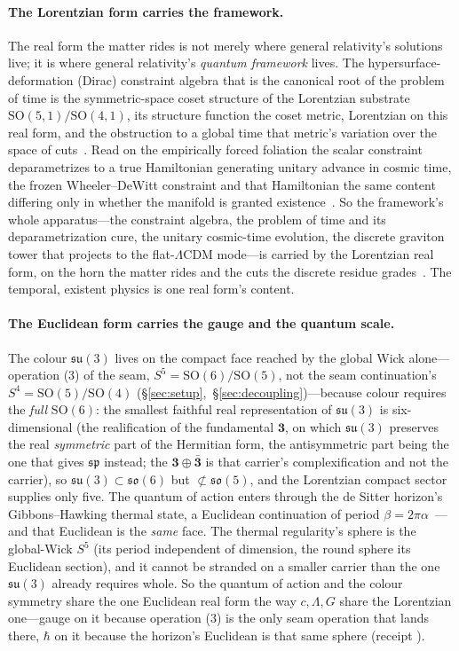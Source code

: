 \documentclass[11pt]{article}
\theoremstyle{plain}
\theoremstyle{remark}
\newcommand{\so}{\mathfrak{so}}
\newcommand{\su}{\mathfrak{su}}
\newcommand{\SO}{\mathrm{SO}}
\begin{document}
\paragraph{The Lorentzian form carries the framework.} The real form the matter rides is not merely where general relativity's solutions live; it is where general relativity's \emph{quantum framework} lives. The hypersurface-deformation (Dirac) constraint algebra that is the canonical root of the problem of time is the symmetric-space coset structure of the Lorentzian substrate $\SO(5,1)/\SO(4,1)$, its structure function the coset metric, Lorentzian on this real form, and the obstruction to a global time that metric's variation over the space of cuts~\cite{JanzenAlgebroid}. Read on the empirically forced foliation the scalar constraint deparametrizes to a true Hamiltonian generating unitary advance in cosmic time, the frozen Wheeler--DeWitt constraint and that Hamiltonian the same content differing only in whether the manifold is granted existence~\cite{JanzenCanonicalTime}. So the framework's whole apparatus---the constraint algebra, the problem of time and its deparametrization cure, the unitary cosmic-time evolution, the discrete graviton tower that projects to the flat-$\Lambda$CDM mode---is carried by the Lorentzian real form, on the horn the matter rides and the cuts the discrete residue grades~\cite{JanzenMatter}. The temporal, existent physics is one real form's content.

\paragraph{The Euclidean form carries the gauge and the quantum scale.} The colour $\su(3)$ lives on the compact face reached by the global Wick alone---operation (3) of the seam, $S^{5}=\SO(6)/\SO(5)$, not the seam continuation's $S^{4}=\SO(5)/\SO(4)$ (\S\ref{sec:setup},~\S\ref{sec:decoupling})---because colour requires the \emph{full} $\SO(6)$: the smallest faithful real representation of $\su(3)$ is six-dimensional (the realification of the fundamental $\mathbf 3$, on which $\su(3)$ preserves the real \emph{symmetric} part of the Hermitian form, the antisymmetric part being the one that gives $\mathfrak{sp}$ instead; the $\mathbf 3\oplus\bar{\mathbf 3}$ is that carrier's complexification and not the carrier), so $\su(3)\subset\so(6)$ but $\not\subset\so(5)$, and the Lorentzian compact sector supplies only five. The quantum of action enters through the de Sitter horizon's Gibbons--Hawking thermal state, a Euclidean continuation of period $\beta=2\pi\alpha$~\cite{JanzenCanonicalTime,JanzenGeometricCore}---and that Euclidean is the \emph{same} face. The thermal regularity's sphere is the global-Wick $S^{5}$ (its period independent of dimension, the round sphere its Euclidean section), and it cannot be stranded on a smaller carrier than the one $\su(3)$ already requires whole. So the quantum of action and the colour symmetry share the one Euclidean real form the way $c,\Lambda,G$ share the Lorentzian one---gauge on it because operation (3) is the only seam operation that lands there, $\hbar$ on it because the horizon's Euclidean is that same sphere (receipt ).
\end{document}
